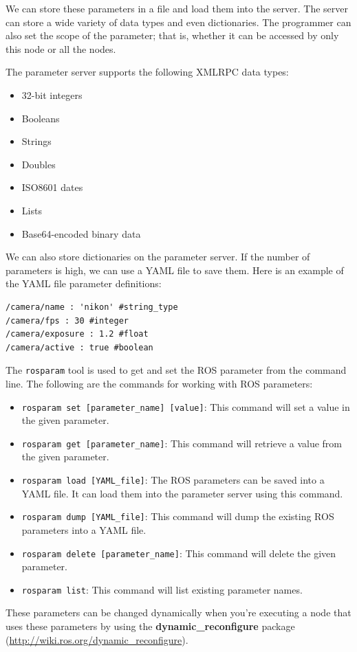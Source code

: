 \documentclass[../../main]{subfiles}
\begin{document}
We can store these parameters in a file and load them into the server. The server can store a wide variety of data types and even dictionaries. The programmer can also set the scope of the parameter; that is, whether it can be accessed by only this node or all the nodes.

The parameter server supports the following XMLRPC data types:
\begin{itemize}
    \item 32-bit integers
    \item Booleans
    \item Strings
    \item Doubles
    \item ISO8601 dates
    \item Lists
    \item Base64-encoded binary data
\end{itemize}

We can also store dictionaries on the parameter server. If the number of parameters is high, we can use a YAML file to save them. Here is an example of the YAML file parameter definitions:

\begin{verbatim}
/camera/name : 'nikon' #string_type
/camera/fps : 30 #integer
/camera/exposure : 1.2 #float
/camera/active : true #boolean
\end{verbatim}

The \texttt{rosparam} tool is used to get and set the ROS parameter from the command line. The following are the commands for working with ROS parameters:
\begin{itemize}
    \item \texttt{rosparam set [parameter\_name] [value]}: This command will set a value in the given parameter.
    \item \texttt{rosparam get [parameter\_name]}: This command will retrieve a value from the given parameter.
    \item \texttt{rosparam load [YAML\_file]}: The ROS parameters can be saved into a YAML file. It can load them into the parameter server using this command.
    \item \texttt{rosparam dump [YAML\_file]}: This command will dump the existing ROS parameters into a YAML file.
    \item \texttt{rosparam delete [parameter\_name]}: This command will delete the given parameter.
    \item \texttt{rosparam list}: This command will list existing parameter names.
\end{itemize}
These parameters can be changed dynamically when you're executing a node that uses these parameters by using the \textbf{dynamic\_reconfigure} package (\url{http://wiki.ros.org/dynamic_reconfigure}).
\end{document}
